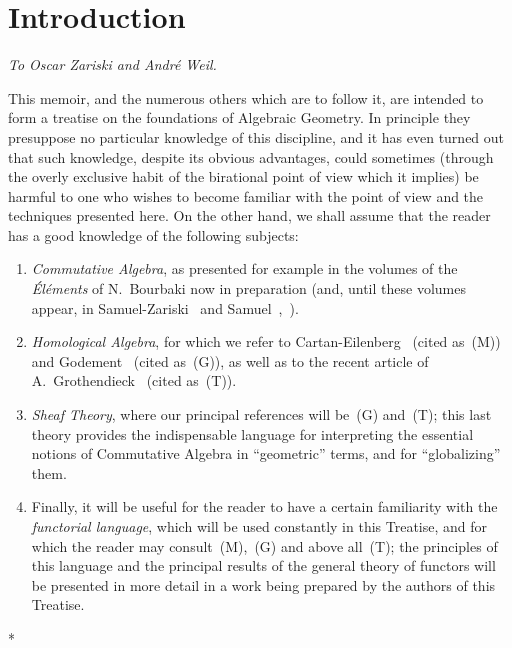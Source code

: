 \section*{Introduction}

\begin{center}
\emph{To Oscar Zariski and André Weil.}
\end{center}


This memoir, and the numerous others which are to follow it, are intended to form a treatise on the foundations of Algebraic Geometry.
In principle they presuppose no particular knowledge of this discipline, and it has even turned out that such knowledge, despite its obvious advantages, could sometimes (through the overly exclusive habit of the birational point of view which it implies) be harmful to one who wishes to become familiar with the point of view and the techniques presented here.
On the other hand, we shall assume that the reader has a good knowledge of the following subjects:

\begin{enumerate}
  \item[a)] \emph{Commutative Algebra}, as presented for example in the volumes of the \emph{Éléments} of N.~Bourbaki now in preparation (and, until these volumes appear, in Samuel-Zariski~\cite{I-13} and Samuel~\cite{I-11},~\cite{I-12}).
  \item[b)] \emph{Homological Algebra}, for which we refer to Cartan-Eilenberg~\cite{I-2} (cited as~(M)) and Godement~\cite{I-4} (cited as~(G)), as well as to the recent article of A.~Grothendieck~\cite{I-6} (cited as~(T)).
  \item[c)] \emph{Sheaf Theory}, where our principal references will be~(G) and~(T); this last theory provides the indispensable language for interpreting the essential notions of Commutative Algebra in ``geometric'' terms, and for ``globalizing'' them.
  \item[d)] Finally, it will be useful for the reader to have a certain familiarity with the \emph{functorial language}, which will be used constantly in this Treatise, and for which the reader may consult~(M),~(G) and above all~(T); the principles of this language and the principal results of the general theory of functors will be presented in more detail in a work being prepared by the authors of this Treatise.
\end{enumerate}

\bigskip
\begin{center}*\quad*\quad*\end{center}
\bigskip

